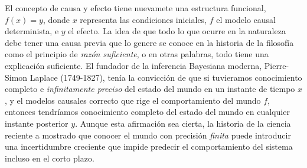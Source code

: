 \documentclass[a4paper,10pt]{book}
\theoremstyle{definition}
\begin{document}
El concepto de causa y efecto tiene nuevamete una estructura funcional, $f(x) = y$, donde $x$ representa las condiciones iniciales, $f$ el modelo causal determinista, e $y$ el efecto.
La idea de que todo lo que ocurre en la naturaleza debe tener una causa previa que lo genere se conoce en la historia de la filosofía como el principio de \emph{razón suficiente}, o en otras palabras, todo tiene una explicación suficiente.
El fundador de la inferencia Bayesiana moderna, Pierre-Simon Laplace (1749-1827), tenía la convicción de que si tuvieramos conocimiento completo e \emph{infinitamente preciso} del estado del mundo en un instante de tiempo $x$, y el modelos causales correcto que rige el comportamiento del mundo $f$, entonces tendríamos conocimiento completo del estado del mundo en cualquier instante posterior $y$.
Aunque esta afirmación sea cierta, la historia de la ciencia reciente a mostrado que conocer el mundo con precisión \emph{finita} puede introducir una incertidumbre creciente que impide predecir el comportamiento del sistema incluso en el corto plazo.
\end{document}
